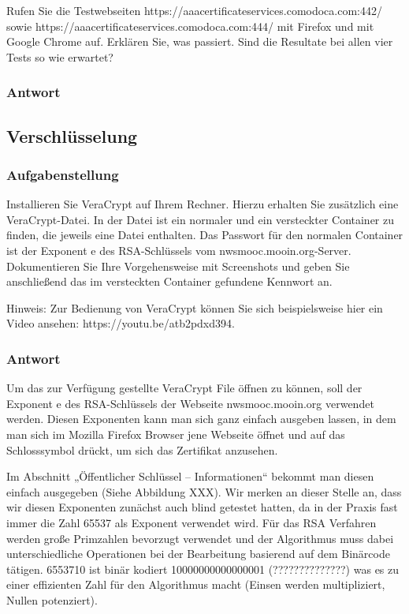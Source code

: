 \documentclass{article}
\begin{document}
Rufen Sie die Testwebseiten https://aaacertificateservices.comodoca.com:442/ sowie 
https://aaacertificateservices.comodoca.com:444/  mit Firefox und mit Google 
Chrome auf. Erklären Sie, was passiert. Sind die Resultate bei allen vier Tests so 
wie erwartet?

\subsubsection*{Antwort}

\newpage

\subsection{Verschlüsselung}

\subsubsection*{Aufgabenstellung}

Installieren Sie VeraCrypt  auf Ihrem Rechner. Hierzu erhalten Sie zusätzlich eine 
VeraCrypt-Datei. In der Datei ist ein normaler und ein versteckter Container 
zu finden, die jeweils eine Datei enthalten. Das Passwort für den normalen 
Container ist der Exponent e des RSA-Schlüssels vom nwsmooc.mooin.org-Server. 
Dokumentieren Sie Ihre Vorgehensweise mit Screenshots und geben Sie 
anschließend das im versteckten Container gefundene Kennwort an.

Hinweis: Zur Bedienung von VeraCrypt können Sie sich beispielsweise hier ein Video 
ansehen: https://youtu.be/atb2pdxd394.

\subsubsection*{Antwort}

Um das zur Verfügung gestellte VeraCrypt File öffnen zu können, soll der Exponent e 
des RSA-Schlüssels der Webseite nwsmooc.mooin.org verwendet werden. Diesen 
Exponenten kann man sich ganz einfach ausgeben lassen, in dem man sich im Mozilla 
Firefox Browser jene Webseite öffnet und auf das Schlosssymbol drückt, um sich 
das Zertifikat anzusehen.

Im Abschnitt „Öffentlicher Schlüssel – Informationen“ bekommt man diesen einfach 
ausgegeben (Siehe Abbildung XXX). Wir merken an dieser Stelle an, dass wir diesen 
Exponenten zunächst auch blind getestet hatten, da in der Praxis fast immer die 
Zahl 65537 als Exponent verwendet wird. Für das RSA Verfahren werden große 
Primzahlen bevorzugt verwendet und der Algorithmus muss dabei unterschiedliche 
Operationen bei der Bearbeitung basierend auf dem Binärcode tätigen. 6553710 ist 
binär kodiert 10000000000000001 (??????????????)
was es zu einer effizienten Zahl für den Algorithmus macht (Einsen werden 
multipliziert, Nullen potenziert).
\end{document}
